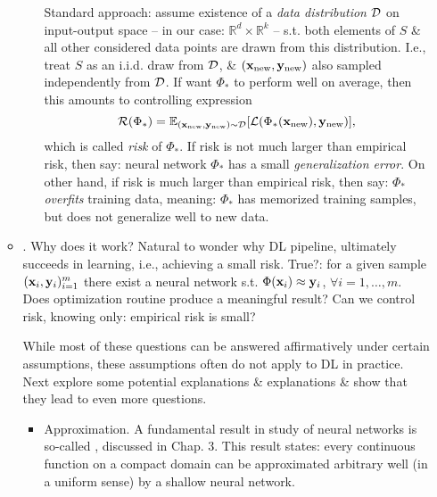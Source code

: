 \documentclass{article}
\begin{document}
\begin{itemize}
\begin{itemize}
\begin{itemize}
			Standard approach: assume existence of a {\it data distribution} ${\cal D}$ on input-output space -- in our case: $\mathbb{R}^d\times\mathbb{R}^k$ -- s.t. both elements of $S$ \& all other considered data points are drawn from this distribution. I.e., treat $S$ as an i.i.d. draw from ${\cal D}$, \& $({\bf x}_{\rm new},{\bf y}_{\rm new})$ also sampled independently from ${\cal D}$. If want $\Phi_*$ to perform well on average, then this amounts to controlling expression
			\begin{equation}
				{\cal R}(\Phi_*) = \mathbb{E}_{({\bf x}_{\rm new},{\bf y}_{\rm new})\sim{\cal D}} [{\cal L}(\Phi_*({\bf x}_{\rm new}),{\bf y}_{\rm new})],
			\end{equation}
			which is called {\it risk} of $\Phi_*$. If risk is not much larger than empirical risk, then say: neural network $\Phi_*$ has a small {\it generalization error}. On other hand, if risk is much larger than empirical risk, then say: $\Phi_*$ {\it overfits} training data, meaning: $\Phi_*$ has memorized training samples, but does not generalize well to new data.
		\end{itemize}
		\item {. Why does it work?} Natural to wonder why DL pipeline, ultimately succeeds in learning, i.e., achieving a small risk. True?: for a given sample $({\bf x}_i,{\bf y}_i)_{i=1}^m$ there exist a neural network s.t. $\Phi({\bf x}_i)\approx{\bf y}_i$, $\forall i = 1,\ldots,m$. Does optimization routine produce a meaningful result? Can we control risk, knowing only: empirical risk is small?
		
		While most of these questions can be answered affirmatively under certain assumptions, these assumptions often do not apply to DL in practice. Next explore some potential explanations \& explanations \& show that they lead to even more questions.
		\begin{itemize}
			\item {\sf Approximation.} A fundamental result in study of neural networks is so-called , discussed in Chap. 3. This result states: every continuous function on a compact domain can be approximated arbitrary well (in a uniform sense) by a shallow neural network.
			

\end{itemize}
\end{itemize}
\end{itemize}
\end{document}

